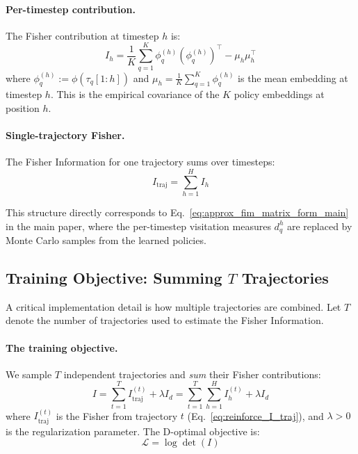 \documentclass{article}
\begin{document}
\paragraph{Per-timestep contribution.} The Fisher contribution at timestep $h$ is:
\begin{equation}
    I_h = \frac{1}{K} \sum_{q=1}^{K} \phi_q^{(h)} (\phi_q^{(h)})^\top - \mu_h \mu_h^\top
    \label{eq:reinforce_I_h}
\end{equation}
where $\phi_q^{(h)} := \phi(\tau_q[1:h])$ and $\mu_h = \frac{1}{K} \sum_{q=1}^K \phi_q^{(h)}$ is the mean embedding at timestep $h$. This is the empirical covariance of the $K$ policy embeddings at position $h$.

\paragraph{Single-trajectory Fisher.} The Fisher Information for one trajectory sums over timesteps:
\begin{equation}
    I_{\text{traj}} = \sum_{h=1}^{H} I_h
    \label{eq:reinforce_I_traj}
\end{equation}

This structure directly corresponds to Eq.~\eqref{eq:approx_fim_matrix_form_main} in the main paper, where the per-timestep visitation measures $d_q^h$ are replaced by Monte Carlo samples from the learned policies.

\subsection{\texorpdfstring{Training Objective: Summing $T$ Trajectories}{Training Objective: Summing T Trajectories}}
\label{sec:reinforce:objective}

A critical implementation detail is how multiple trajectories are combined. Let $T$ denote the number of trajectories used to estimate the Fisher Information.

\paragraph{The training objective.} We sample $T$ independent trajectories and \emph{sum} their Fisher contributions:
\begin{equation}
    I = \sum_{t=1}^{T} I_{\text{traj}}^{(t)} + \lambda I_d = \sum_{t=1}^{T} \sum_{h=1}^{H} I_h^{(t)} + \lambda I_d
    \label{eq:reinforce_I_sum}
\end{equation}
where $I_{\text{traj}}^{(t)}$ is the Fisher from trajectory $t$ (Eq.~\ref{eq:reinforce_I_traj}), and $\lambda > 0$ is the regularization parameter. The D-optimal objective is:
\begin{equation}
    \mathcal{L} = \log \det(I)
    \label{eq:reinforce_logdet}
\end{equation}
\end{document}
